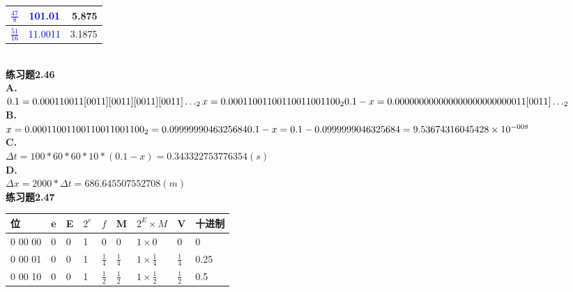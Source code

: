 \documentclass{article}
\newcommand{\blue}[1]{\textcolor{blue}{#1}}
\begin{document}
\begin{CJK}{UTF8}{uyhei}
\begin{table}[htbp]
\begin{tabular}{|l|c|r|}
		\hline
		\blue{$\frac{47}{8}$}		&	\blue{ 101.01 }	&	5.875	\\
		\hline
		\blue{$\frac{51}{16}$}		&	\blue{11.0011}	&	3.1875	\\
		\hline
	\end{tabular}
\end{table}	\\
\textbf{练习题2.46}	\\
\textbf{A.} 	\\
\begin{math}
	0.1=0.000110011[0011][0011][0011][0011]\dots_2	\\
	  x=0.000110011 0011  0011  0011  00_2	\\
	  0.1-x=0.000000000 00000 00000 0000  0011 [0011]\dots_2
\end{math}	\\
\textbf{B.} 	\\
\begin{math}	
	x=0.000110011 0011  0011  0011  00_2=0.0999999046325684	\\
	0.1-x=0.1-0.0999999046325684=9.53674316045428\times10^{ -008 }
\end{math}	\\
\textbf{C.}	\\
\begin{math}	
	\Delta t=100*60*60*10*(0.1-x)=0.343322753776354(s)
\end{math}	\\
\textbf{D.}	\\
\begin{math}	
	\Delta x=2000*\Delta t=686.645507552708(m)
\end{math}	\\[3ex]
\newpage	
\renewcommand\arraystretch{1.5}
\noindent\textbf{练习题2.47}	
\begin{table}[ht]
\centering
\begin{tabular}{|m{5em}<{\centering}|m{5em}<{\centering}|m{5em}<{\centering}|m{5em}<{\centering}|m{5em}<{\centering}|m{5em}<{\centering}|m{5em}<{\centering}|m{5em}<{\centering}|m{5em}<{\centering}|}
	\hline
	位	&	e	&	E	&	$2^e$	&	$f$	&	M	&	$2^E\times M$	&	V	&	十进制	\\
	\hline
	0 00 00	&	0	&	0	&	1	&	0	&	0	&	$1\times 0$	&	0	&	0	\\
	\hline
	0 00 01	&	0	&	0	&	1	&	$\frac{1}{4}$	&	$\frac{1}{4}$	&	$1\times \frac{1}{4}$	&	$\frac{1}{4}$	&	0.25	\\
	\hline
	0 00 10	&	0	&	0	&	1	&	$\frac{1}{2}$	&	$\frac{1}{2}$	&	$1\times \frac{1}{2}$	&	$\frac{1}{2}$	&	0.5	\\

\end{tabular}
\end{table}
\end{CJK}
\end{document}
